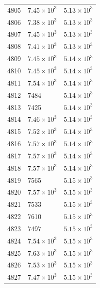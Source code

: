 \begin{table}[H]
\begin{tabular}{lll}
4805 & $\displaystyle 7.45 \times 10^{3}$ & $\displaystyle 5.13 \times 10^{3}$ \\
4806 & $\displaystyle 7.38 \times 10^{3}$ & $\displaystyle 5.13 \times 10^{3}$ \\
4807 & $\displaystyle 7.45 \times 10^{3}$ & $\displaystyle 5.13 \times 10^{3}$ \\
4808 & $\displaystyle 7.41 \times 10^{3}$ & $\displaystyle 5.13 \times 10^{3}$ \\
4809 & $\displaystyle 7.45 \times 10^{3}$ & $\displaystyle 5.14 \times 10^{3}$ \\
4810 & $\displaystyle 7.45 \times 10^{3}$ & $\displaystyle 5.14 \times 10^{3}$ \\
4811 & $\displaystyle 7.54 \times 10^{3}$ & $\displaystyle 5.14 \times 10^{3}$ \\
4812 & 7484 & $\displaystyle 5.14 \times 10^{3}$ \\
4813 & 7425 & $\displaystyle 5.14 \times 10^{3}$ \\
4814 & $\displaystyle 7.46 \times 10^{3}$ & $\displaystyle 5.14 \times 10^{3}$ \\
4815 & $\displaystyle 7.52 \times 10^{3}$ & $\displaystyle 5.14 \times 10^{3}$ \\
4816 & $\displaystyle 7.57 \times 10^{3}$ & $\displaystyle 5.14 \times 10^{3}$ \\
4817 & $\displaystyle 7.57 \times 10^{3}$ & $\displaystyle 5.14 \times 10^{3}$ \\
4818 & $\displaystyle 7.57 \times 10^{3}$ & $\displaystyle 5.14 \times 10^{3}$ \\
4819 & 7565 & $\displaystyle 5.15 \times 10^{3}$ \\
4820 & $\displaystyle 7.57 \times 10^{3}$ & $\displaystyle 5.15 \times 10^{3}$ \\
4821 & 7533 & $\displaystyle 5.15 \times 10^{3}$ \\
4822 & 7610 & $\displaystyle 5.15 \times 10^{3}$ \\
4823 & 7497 & $\displaystyle 5.15 \times 10^{3}$ \\
4824 & $\displaystyle 7.54 \times 10^{3}$ & $\displaystyle 5.15 \times 10^{3}$ \\
4825 & $\displaystyle 7.63 \times 10^{3}$ & $\displaystyle 5.15 \times 10^{3}$ \\
4826 & $\displaystyle 7.53 \times 10^{3}$ & $\displaystyle 5.15 \times 10^{3}$ \\
4827 & $\displaystyle 7.47 \times 10^{3}$ & $\displaystyle 5.15 \times 10^{3}$ \\

\end{tabular}
\end{table}
